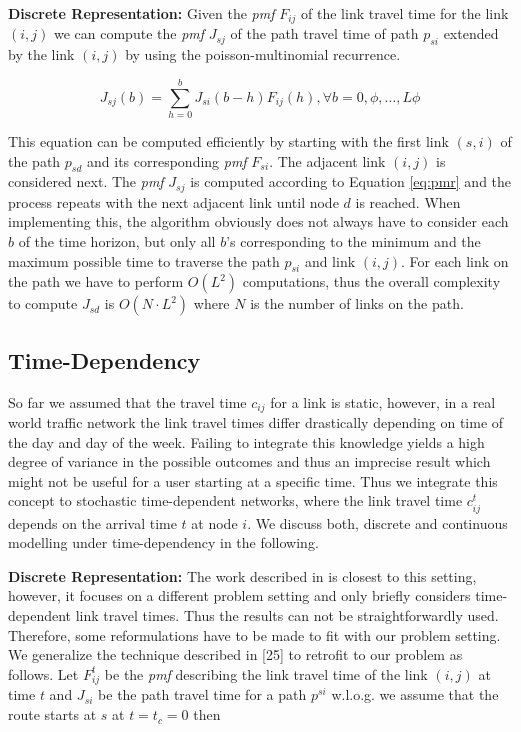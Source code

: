 \textbf{Discrete Representation: } Given the \textit{pmf} $F_{ij}$ of the link travel
time for the link $(i,j)$ we can compute the \textit{pmf} $J_{sj}$ of the path travel time of path $p_{si}$ extended by the link
$(i,j)$ by using the poisson-multinomial recurrence.

\begin{equation}
\label{eq:pmr}
	J_{sj}(b) = \sum_{h=0}^b J_{si}(b-h) F_{ij}(h)  , \forall b = 0, \phi,\ldots, L
	\phi
\end{equation}

This equation can be computed efficiently by starting with the first link
$(s,i)$ of the path $p_{sd}$ and its corresponding \textit{pmf} $F_{si}$. The adjacent
link $(i,j)$ is considered next. The \textit{pmf} $J_{sj}$ is computed according to
Equation \ref{eq:pmr} and the process repeats with the next adjacent link until
node $d$ is reached. When implementing this, the algorithm obviously does not
always have to consider each $b$ of the time horizon, but only all $b$'s corresponding to
the minimum and the maximum possible time to traverse the path $p_{si}$ and link
$(i,j)$. For each link on the path we have to perform $O(L^2)$
computations, thus the overall complexity to compute $J_{sd}$ is $O(N \cdot
L^2)$ where $N$ is the number of links on the path. 

\subsection{Time-Dependency}
\label{subsec:time}
So far we assumed that the travel time $c_{ij}$ for a link is static, however,
in a real world traffic network the link travel times differ drastically
depending on time of the day and day of the week. Failing to integrate this
knowledge yields a high degree of variance in the possible outcomes and thus an
imprecise result which might not be useful for a user starting at a specific
time. Thus we integrate this concept to stochastic time-dependent networks,
where the link travel time $c_{ij}^t$ depends on the arrival time $t$ at node
$i$. We discuss both, discrete and continuous modelling under time-dependency in the following.

\textbf{Discrete Representation: } The work
described in \cite{NieWu09} is closest to this setting, however, it
focuses on a different problem setting and only briefly considers time-dependent
link travel times. Thus the results can not be straightforwardly used.
Therefore, some reformulations have to be made to fit with our problem setting.
We generalize the technique described in [25]  to retrofit to our problem as follows.  
Let $F_{ij}^t$ be the \textit{pmf} describing the link travel time of the link $(i,j)$ at
time $t$ and $J_{si}$ be the path travel time for a path $p^{si}$ w.l.o.g. we
assume that the route starts at $s$ at $t = t_c = 0$ then

